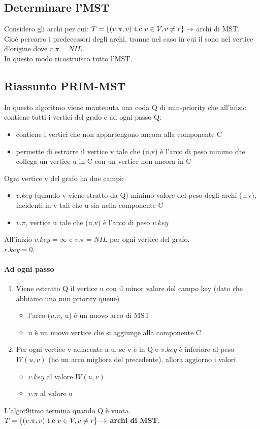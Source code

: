 \subsection{Determinare l'MST}
Considero gli archi per cui: $T = \{(v.\pi, v)\text{ t.c } v \in V, v \neq r\} \rightarrow$ archi di MST.\\
Cioè percorro i predecessori degli archi, tranne nel caso in cui il sono nel vertice d'origine dove
$r.\pi = NIL$.\\ In questo modo ricostruisco tutto l'MST.
\subsection{Riassunto PRIM-MST}
In questo algoritmo viene mantenuta una coda Q di min-priority che all'inizio contiene tutti
i vertici del grafo e ad ogni passo Q:
\begin{itemize}
    \item contiene i vertici che non appartengono ancora alla componente C
    \item permette di estrarre il vertice v tale che (u,v) è l'arco di peso minimo che collega
    un vertice u in C con un vertice non ancora in C
\end{itemize}
Ogni vertice v del grafo ha due campi:
\begin{itemize}
    \item $v.key$ (quando v viene stratto da Q) minimo valore del peso degli archi (u,v), incidenti
    in v tali che u sia nella componente C
    \item $v.\pi$, vertice u tale che (u,v) è l'arco di peso $v.key$
\end{itemize}
All'inizio $v.key = \infty$ e $v.\pi = NIL$ per ogni vertice del grafo.\\
$r.key = 0$.
\paragraph*{Ad ogni passo}
\begin{enumerate}
    \item Viene estratto Q il vertice u con il minor valore del campo key (dato che abbiamo una
    min priority queue)
    \begin{itemize}
        \item l'arco ($u.\pi$, u) è un nuovo arco di MST
        \item u è un nuovo vertice che si aggiunge alla componente C
    \end{itemize}
    \item Per ogni vertice v adiacente a u, se v è in Q e \textbf{$v.key$} è inferiore al peso $W(u,v)$
    (ho un arco migliore del precedente), allora aggiorno i valori
    \begin{itemize}
        \item \textbf{$v.key$} al valore $W(u,v)$
        \item \textbf{$v.\pi$} al valore u
    \end{itemize}
\end{enumerate}
L'algor9itmo termina quando Q è vuota.\\
\textbf{$T = \{(v.\pi, v)\text{ t.c } v \in V, v \neq r\} \rightarrow$  archi di MST}.
